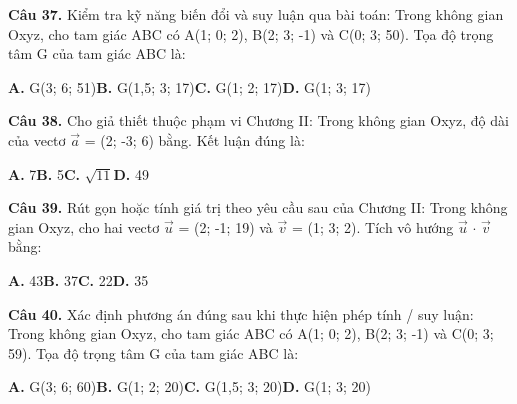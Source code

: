\documentclass[11pt,a4paper]{article}
\begin{document}
\textbf{\color{primary} Câu 37.} Kiểm tra kỹ năng biến đổi và suy luận qua bài toán: Trong không gian Oxyz, cho tam giác ABC có A(1; 0; 2), B(2; 3; -1) và C(0; 3; 50). Tọa độ trọng tâm G của tam giác ABC là:\par
\hspace*{1.5em}\textbf{A.} G(3; 6; 51)\quad\quad \textbf{B.} G(1,5; 3; 17)\quad\quad \textbf{C.} G(1; 2; 17)\quad\quad \textbf{D.} G(1; 3; 17)\par\vspace{2pt}
\textbf{\color{primary} Câu 38.} Cho giả thiết thuộc phạm vi Chương II: Trong không gian Oxyz, độ dài của vectơ $\vec{a}$ = (2; -3; 6) bằng. Kết luận đúng là:\par
\hspace*{1.5em}\textbf{A.} 7\quad\quad \textbf{B.} 5\quad\quad \textbf{C.} $\sqrt{11}$\quad\quad \textbf{D.} 49\par\vspace{2pt}
\textbf{\color{primary} Câu 39.} Rút gọn hoặc tính giá trị theo yêu cầu sau của Chương II: Trong không gian Oxyz, cho hai vectơ $\vec{u}$ = (2; -1; 19) và $\vec{v}$ = (1; 3; 2). Tích vô hướng $\vec{u}$ $\cdot$ $\vec{v}$ bằng:\par
\hspace*{1.5em}\textbf{A.} 43\quad\quad \textbf{B.} 37\quad\quad \textbf{C.} 22\quad\quad \textbf{D.} 35\par\vspace{2pt}
\textbf{\color{primary} Câu 40.} Xác định phương án đúng sau khi thực hiện phép tính / suy luận: Trong không gian Oxyz, cho tam giác ABC có A(1; 0; 2), B(2; 3; -1) và C(0; 3; 59). Tọa độ trọng tâm G của tam giác ABC là:\par
\hspace*{1.5em}\textbf{A.} G(3; 6; 60)\quad\quad \textbf{B.} G(1; 2; 20)\quad\quad \textbf{C.} G(1,5; 3; 20)\quad\quad \textbf{D.} G(1; 3; 20)\par\vspace{2pt}
\end{document}
